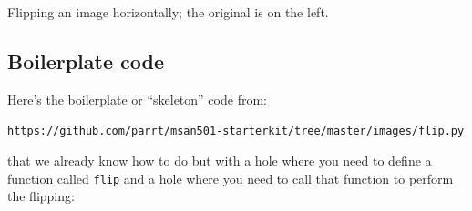 \documentclass[titlepage]{tufte-book}
\begin{document}
\begin{marginfigure}
\begin{center}
 
\end{center}
\caption{Flipping an image horizontally; the original is on the left.}
\label{flipped}
\end{marginfigure}

\subsection{Boilerplate code}

Here's the boilerplate or ``skeleton'' code from:

\href{https://github.com/parrt/msan501-starterkit/tree/master/images/flip.py}{\tt\small https://github.com/parrt/msan501-starterkit/tree/master/images/flip.py}

\noindent that we already know how to do but with a hole where you need to define a function called {\tt flip} and a hole where you need to call that function to perform the flipping:
\end{document}
